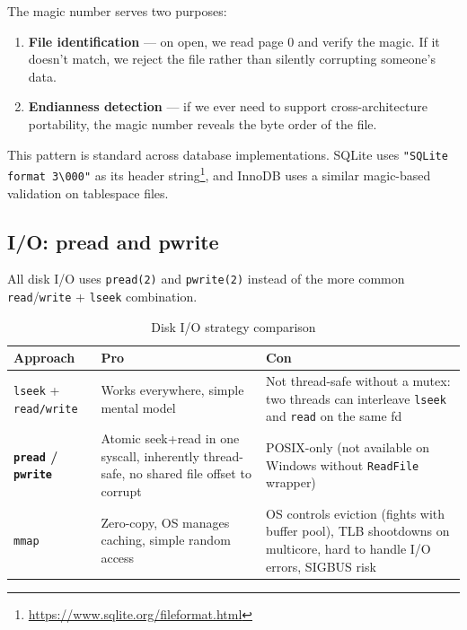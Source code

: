 \documentclass[12pt, a4paper]{report}
\begin{document}
The magic number serves two purposes:
\begin{enumerate}[itemsep=2pt]
    \item \textbf{File identification} --- on open, we read page 0 and verify
          the magic. If it doesn't match, we reject the file rather than
          silently corrupting someone's data.
    \item \textbf{Endianness detection} --- if we ever need to support
          cross-architecture portability, the magic number reveals the byte
          order of the file.
\end{enumerate}

This pattern is standard across database implementations. SQLite uses
\texttt{"SQLite format 3\textbackslash000"} as its header
string\footnote{\url{https://www.sqlite.org/fileformat.html}}, and
InnoDB uses a similar magic-based validation on tablespace files.


\subsection{I/O: pread and pwrite}

All disk I/O uses \texttt{pread(2)} and \texttt{pwrite(2)} instead of the
more common \texttt{read}/\texttt{write} + \texttt{lseek} combination.

\begin{table}[h]
\centering
\begin{tabularx}{\textwidth}{lXX}
\toprule
\textbf{Approach} & \textbf{Pro} & \textbf{Con} \\
\midrule
\texttt{lseek} + \texttt{read/write} &
    Works everywhere, simple mental model &
    Not thread-safe without a mutex: two threads can interleave
    \texttt{lseek} and \texttt{read} on the same fd \\
\addlinespace
\textbf{\texttt{pread} / \texttt{pwrite}} &
    Atomic seek+read in one syscall, inherently thread-safe,
    no shared file offset to corrupt &
    POSIX-only (not available on Windows without \texttt{ReadFile} wrapper) \\
\addlinespace
\texttt{mmap} &
    Zero-copy, OS manages caching, simple random access &
    OS controls eviction (fights with buffer pool), TLB shootdowns on
    multicore, hard to handle I/O errors, SIGBUS risk \\
\bottomrule
\end{tabularx}
\caption{Disk I/O strategy comparison}
\end{table}
\end{document}

